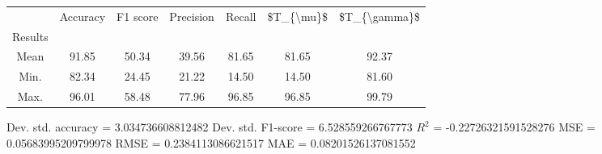 \begin{tabular}{|c|c|c|c|c|c|c|}
\toprule
{} &  Accuracy &  F1 score &  Precision &  Recall &  \$T\_\{\textbackslash mu\}\$ &  \$T\_\{\textbackslash gamma\}\$ \\
Results &           &           &            &         &            &               \\
\hline
Mean    &     91.85 &     50.34 &      39.56 &   81.65 &      81.65 &         92.37 \\
Min.    &     82.34 &     24.45 &      21.22 &   14.50 &      14.50 &         81.60 \\
Max.    &     96.01 &     58.48 &      77.96 &   96.85 &      96.85 &         99.79 \\
\bottomrule
\end{tabular}

 Dev. std. accuracy = 3.034736608812482
 Dev. std. F1-score = 6.528559266767773
 $R^2$ = -0.22726321591528276
 MSE = 0.05683995209799978
 RMSE = 0.2384113086621517
 MAE = 0.08201526137081552